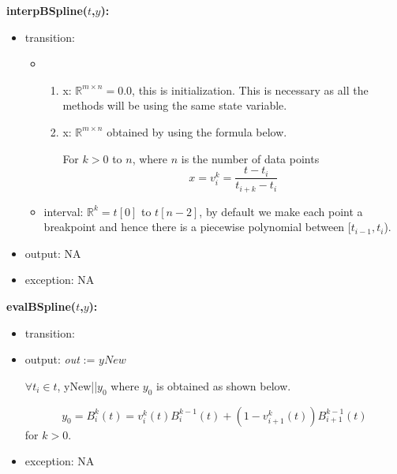\documentclass[12pt, titlepage]{article}
\begin{document}
\noindent \textbf{interpBSpline($t$,$y$):}
\begin{itemize}
	\item transition: 
	
		\begin{itemize}
		\item 
		\begin{enumerate}
			\item x: $\mathbb{R}^{m \times n} = 0.0 $, this is initialization. 
			This is necessary as all the methods will be using the same state 
			variable.
			
			\item x: $\mathbb{R}^{m \times n}$ obtained by using the formula 
			below.
			
			For $k>0$ to $n$, where $n$ is the number of data points
			\begin{equation*}
			x = v_i ^k = \frac{t-t_i}{t_{i+k} - t_i}
			\end{equation*}
			
			
		\end{enumerate}
		\item interval: $\mathbb{R}^{k} = t[0] $ to $t[n-2]$, by default we 
		make each point a breakpoint and hence there is a piecewise polynomial 
		between [$t_{i-1},t_i$).
	\end{itemize}
	
	
	 
	\item output: NA 	
	 
	\item exception: NA 
\end{itemize}


\noindent \textbf{evalBSpline($t$,$y$):}
\begin{itemize}
	\item transition: 
	
	\item output:  \textit{out} := $yNew$
	
	$\forall t_i \in t$, yNew||$y_0$ where $y_0$ is obtained as shown 
	below.
	
	\begin{equation*}
	y_0 = B_i ^k (t) = v_i ^k (t) B_i ^{k-1} (t) + (1 - v_{i+1} ^k (t))B_{i+1} 
	^{k-1} 
	(t)
	\end{equation*} 
	for $k>0$.\\
	\item exception: NA
\end{itemize}
\end{document}
